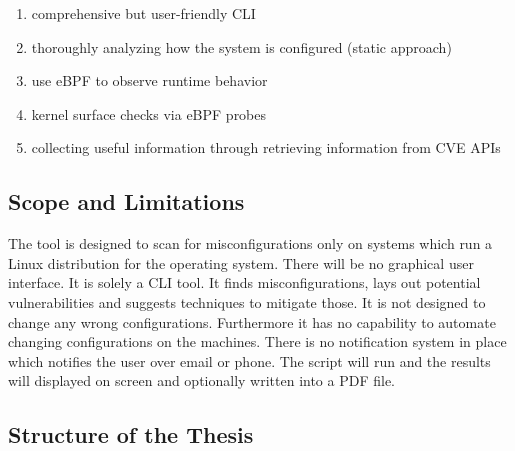 \begin{enumerate}
	\item comprehensive but user-friendly CLI
	\item thoroughly analyzing how the system is configured (static approach)
	\item use eBPF to observe runtime behavior
	\item kernel surface checks via eBPF probes
	\item collecting useful information through retrieving information from CVE APIs
\end{enumerate}

\subsection{Scope and Limitations}

The tool is designed to scan for misconfigurations only on systems which run a Linux distribution for the operating system. There will be no graphical user interface. It is solely a CLI tool. \newline It finds misconfigurations, lays out potential vulnerabilities and suggests techniques to mitigate those. It is not designed to change any wrong configurations. Furthermore it has no capability to automate changing configurations on the machines. \newline\newline There is no notification system in place which notifies the user over email or phone. The script will run and the results will displayed on screen and optionally written into a PDF file. 

\subsection{Structure of the Thesis}

